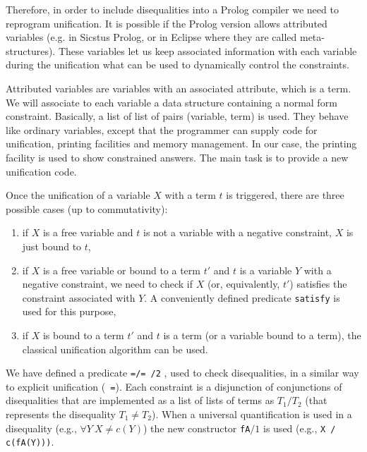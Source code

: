 \documentclass{llncs}
\begin{document}
Therefore, in order to include disequalities into a Prolog compiler we
need to reprogram unification. It is possible if the Prolog version
allows attributed variables \cite{Carlsson} (e.g. in Sicstus Prolog,
or in Eclipse where they are called meta-structures). These variables
let us keep associated information with each variable during the
unification what can be used to dynamically control the constraints.

Attributed variables are variables with an associated attribute, which
is a term. We will associate to each variable a data structure
containing a normal form constraint. Basically, a list of list of
pairs (variable, term) is used. They behave like ordinary variables,
except that the programmer can supply code for unification, printing
facilities and memory management.  In our case, the printing facility
is used to show constrained answers. The main task is to provide a new
unification code.

Once the unification of a variable $X$ with a term $t$ is
triggered, there are three possible cases (up to
commutativity):

\begin{enumerate}
\item if $X$ is a free variable and $t$ is not a variable with a negative
constraint, $X$ is just bound to $t$,
\item if $X$ is a free variable or bound to a term $t'$ and
$t$ is a variable $Y$ with a negative constraint, we need to check
if $X$ (or, equivalently, $t'$) satisfies the constraint associated with $Y$.
A conveniently defined predicate {\tt satisfy} is used for this purpose,
\item if $X$ is bound to a term $t'$ and $t$ is a term (or a variable
bound to a term), the classical unification algorithm can be used.
\end{enumerate}

We have defined a predicate {\tt =/= /2} \cite{SusanaPADL2000}, used
to check disequalities, in a similar way to explicit unification ({\tt
  =}). Each constraint is a disjunction of conjunctions of
disequalities that are implemented as a list of lists of terms as
$T_1/T_2$ (that represents the disequality $T_1 \neq T_2$). When a
universal quantification is used in a disequality (e.g., $\forall Y~ X
\neq c(Y)$) the new constructor {\tt fA}$/1$ is used (e.g., {\tt X /
  c(fA(Y)))}.
\end{document}
